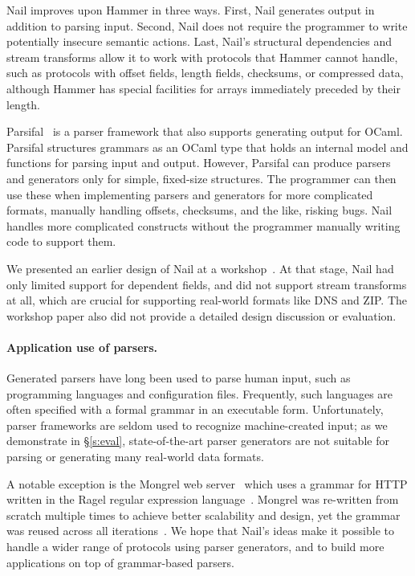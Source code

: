Nail improves upon Hammer in three ways.  First, Nail generates output in
addition to parsing input.  Second, Nail does not require the programmer
to write potentially insecure semantic actions.  Last, Nail's structural
dependencies and stream transforms allow it to work with protocols that
Hammer cannot handle, such as protocols with offset fields, length fields,
checksums, or compressed data, although Hammer has special facilities for
arrays immediately preceded by their length.

Parsifal~\cite{ANSSI:parsifal} is a parser framework that also supports
generating output for OCaml.  Parsifal structures grammars as an OCaml
type that holds an internal model and functions for parsing input and
output.  However, Parsifal can produce parsers and generators
only for simple, fixed-size structures.  The programmer can then use
these when implementing parsers and generators for more complicated
formats, manually handling offsets, checksums, and the like, risking bugs.
Nail handles more complicated constructs without the programmer manually
writing code to support them.

We presented an earlier design of Nail at a
workshop~\cite{bangert:nail-langsec-anon}.  At that stage, Nail had only
limited support for dependent fields, and did not support stream
transforms at all, which are crucial for supporting real-world formats
like DNS and ZIP\@.  The workshop paper also did not provide a detailed
design discussion or evaluation.


\paragraph{Application use of parsers.}

Generated parsers have long been used to parse human input, such
as programming languages and configuration files. Frequently, such
languages are often specified with a formal grammar in an executable
form. Unfortunately, parser frameworks are seldom used to recognize
machine-created input; as we demonstrate in \S\ref{s:eval},
state-of-the-art parser generators are not suitable for parsing or
generating many real-world data formats.

A notable exception is the Mongrel web server~\cite{mongrel} which
uses a grammar for HTTP written in the Ragel regular expression
language~\cite{ragel-paper}.  Mongrel was re-written from scratch
multiple times to achieve better scalability and design, yet the
grammar was reused across all iterations~\cite{patterson-citation}.
We hope that Nail's ideas make it possible to handle a wider range of
protocols using parser generators, and to build more applications on
top of grammar-based parsers.


